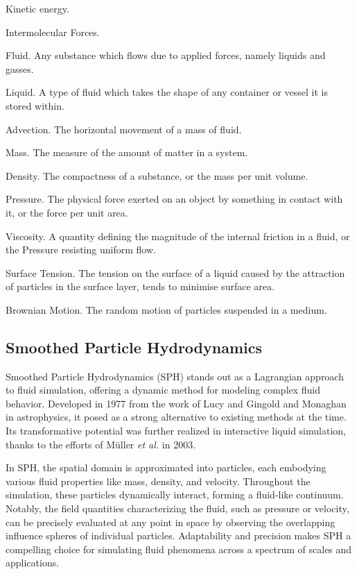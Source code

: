 \documentclass[write-up.tex]{subfiles}
\begin{document}
\begin{worddefs}
 \item[Kinetic energy.]
 \item[Intermolecular Forces.]
 \item [Fluid.] Any substance which flows due to applied forces, namely liquids and gasses.
 \item [Liquid.] A type of fluid which takes the shape of any container or vessel it is stored within.
 \item[Advection.] The horizontal movement of a mass of fluid.
 \item[Mass.] The measure of the amount of matter in a system.
 \item[Density.] The compactness of a substance, or the mass per unit volume.
 \item[Pressure.] The physical force exerted on an object by something in contact with it, or the force per unit area.
 \item[Viscosity.] A quantity defining the magnitude of the internal friction in a fluid, or the Pressure resisting uniform flow.
 \item[Surface Tension.] The tension on the surface of a liquid caused by the attraction of particles in the surface layer, tends to minimise surface area.
 \item[Brownian Motion.] The random motion of particles suspended in a medium.
\end{worddefs}

\subsection{Smoothed Particle Hydrodynamics}
Smoothed Particle Hydrodynamics (SPH) stands out as a Lagrangian approach to fluid simulation, offering a dynamic method for modeling complex fluid behavior. Developed in 1977 from the work of Lucy \cite{lucy} and Gingold and Monaghan \cite{gingold} in astrophysics, it posed as a strong alternative to existing methods at the time. Its transformative potential was further realized in interactive liquid simulation, thanks to the efforts of Müller \textit{et al.} \cite{muller} in 2003.

In SPH, the spatial domain is approximated into particles, each embodying various fluid properties like mass, density, and velocity. Throughout the simulation, these particles dynamically interact, forming a fluid-like continuum. Notably, the field quantities characterizing the fluid, such as pressure or velocity, can be precisely evaluated at any point in space by observing the overlapping influence spheres of individual particles. Adaptability and precision makes SPH a compelling choice for simulating fluid phenomena across a spectrum of scales and applications.
\end{document}
